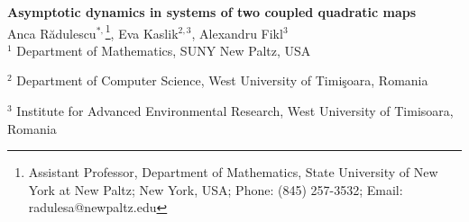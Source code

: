 \documentclass[10pt]{article}
\begin{document}

\begin{flushleft}
{\Large
\textbf{Asymptotic dynamics in systems of two coupled quadratic maps}
}
\\
\vspace{4mm}
Anca R\u{a}dulescu$^{*,}$\footnote{Assistant Professor, Department of Mathematics, State University of New York at New Paltz; New York, USA; Phone: (845) 257-3532; Email: radulesa@newpaltz.edu}, Eva Kaslik$^{2,3}$, Alexandru Fikl$^3$\\

\indent $^1$ Department of Mathematics, SUNY New Paltz, USA

\indent $^2$ Department of Computer Science, West University of Timi\c{s}oara, Romania

\indent $^3$ Institute for Advanced Environmental Research, West University of Timisoara, Romania
\end{flushleft}

\end{document}

